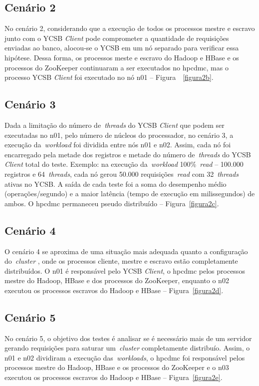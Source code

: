\documentclass[12pt]{article}
\begin{document}
\subsection{Cenário 2}

No cenário 2, considerando que a execução de todos os processos mestre e escravo junto com o YCSB \emph{Client} pode comprometer a quantidade de requisições enviadas ao banco, alocou-se o YCSB em um nó separado para verificar essa hipótese. Dessa forma, os processos meste e escravo do Hadoop e HBase e os processos do ZooKeeper continuaram a ser executados no hpcdmc, mas o processo YCSB \emph{Client} foi executado no nó n01 -- Figura~~\ref{figura2b}.

\subsection{Cenário 3}

Dada a limitação do número de~\emph{threads} do YCSB \emph{Client} que podem ser executadas no n01, pelo número de núcleos do processador, no cenário 3, a execução da~\emph{workload} foi dividida entre nós n01 e n02. Assim, cada nó foi encarregado pela metade dos registros e metade do número de~\emph{threads} do YCSB \emph{Client} total do teste. Exemplo: na execução da~\emph{workload} 100\%~\emph{read} -- 100.000 registros e 64~\emph{threads}, cada nó gerou 50.000 requisições~\emph{read} com 32~\emph{threads} ativas no YCSB. A saída de cada teste foi a soma do desempenho médio (operações/segundo) e a maior latência (tempo de execução em milissegundos) de ambos. O hpcdmc permaneceu pseudo distribuído -- Figura~\ref{figura2c}.

\subsection{Cenário 4}
O cenário 4 se aproxima de uma situação mais adequada quanto a configuração do~\emph{cluster} , onde os processos cliente, mestre e escravo estão completamente distribuídos. O n01 é responsável pelo YCSB \textit{Client}, o hpcdmc pelos processos mestre do Hadoop, HBase e dos processos do ZooKeeper, enquanto o n02 executou os processos escravos do Hadoop e HBase -- Figura~\ref{figura2d}.

\subsection{Cenário 5}
No cenário 5, o objetivo dos testes é analisar se é necessário mais de um servidor gerando
requisições para saturar um~\emph{cluster}  completamente distribuío. Assim, o n01 e n02 dividiram a execução das~\emph{workloads}, o hpcdmc foi responsável pelos processos mestre do Hadoop, HBase e os processos do ZooKeeper e o n03 executou os processos escravos do Hadoop e HBase -- Figura~\ref{figura2e}.
\end{document}

